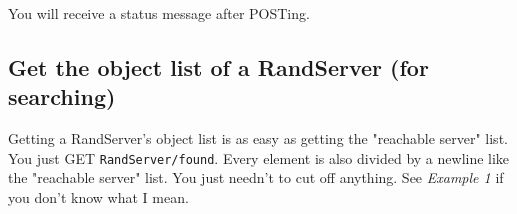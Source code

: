 \documentclass[letterpaper,twoside]{scrartcl}
\begin{document}

   \vspace{8mm}

   \newline\newline
   You will receive a status message after POSTing.\newline\newline





  \subsection{Get the object list of a RandServer (for searching)}
   Getting a RandServer's object list is as easy as getting the "reachable server" list. You just GET \texttt{RandServer/found}.
   Every element is also divided by a newline like the "reachable server" list. You just needn't to cut off anything.
   \newline
   See \textit{Example 1} if you don't know what I mean.


 \newpage
\end{document}
